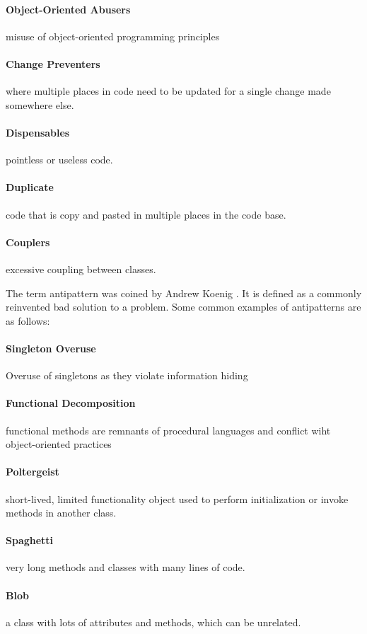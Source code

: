 \documentclass[conference]{IEEEtran}
\begin{document}
\paragraph{Object-Oriented Abusers} misuse of object-oriented programming principles
\paragraph{Change Preventers} where multiple places in code need to be updated for a single change made somewhere else.
\paragraph{Dispensables} pointless or useless code.
\paragraph{Duplicate} code that is copy and pasted in multiple places in the code base.
\paragraph{Couplers} excessive coupling between classes.

The term antipattern was coined by Andrew Koenig \cite{koenig_patterns_1998}. 
It is defined as a commonly reinvented bad solution to a problem.
Some common examples of antipatterns are as follows:
\paragraph{Singleton Overuse} Overuse of singletons as they violate information hiding
\paragraph{Functional Decomposition} functional methods are remnants of procedural languages and conflict wiht object-oriented practices
\paragraph{Poltergeist} short-lived, limited functionality object used to perform initialization or invoke methods in another class.
\paragraph{Spaghetti} very long methods and classes with many lines of code.
\paragraph{Blob} a class with lots of attributes and methods, which can be unrelated.
\end{document}
